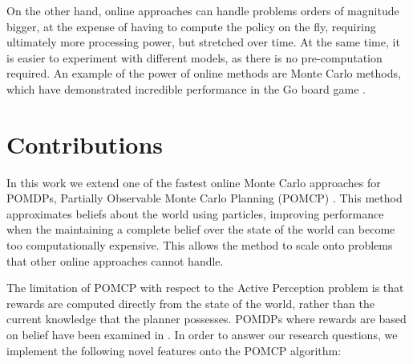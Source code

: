 On the other hand, online approaches can handle problems orders of magnitude bigger, at the expense
of having to compute the policy on the fly, requiring ultimately more processing power, but stretched
over time. At the same time, it is easier to experiment with different models, as there is no
pre-computation required. An example of the power of online methods are Monte Carlo methods, which
have demonstrated incredible performance in the Go board game \cite{cit:mcts}.

\section{Contributions}

In this work we extend one of the fastest online Monte Carlo approaches for POMDPs, Partially
Observable Monte Carlo Planning (POMCP) \cite{cit:pomcp}. This method approximates beliefs about the
world using particles, improving performance when the maintaining a complete belief over the state
of the world can become too computationally expensive. This allows the method to scale onto problems
that other online approaches cannot handle.

The limitation of POMCP with respect to the Active Perception problem is that rewards are computed
directly from the state of the world, rather than the current knowledge that the planner possesses.
POMDPs where rewards are based on belief have been examined in \cite{cit:rpomdp}. In order to answer
our research questions, we implement the following novel features onto the POMCP algorithm:

